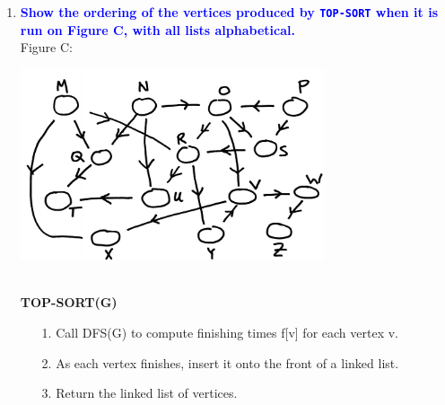\documentclass[11pt]{article}
\begin{document}
\begin{enumerate}
\item \textbf{\textcolor{blue}{Show the ordering of the vertices produced by {\tt TOP-SORT}
when it is run on Figure C, with all lists alphabetical.}}
\\ Figure C: \\
\begin{center}
    \includegraphics[width=90mm]{figureC.jpg}
\end{center}
    \\ \textbf{TOP-SORT(G)}
    \begin{itemize}
        \item [1.] Call DFS(G) to compute finishing times f[v] for each vertex v.
        \item [2.] As each vertex finishes, insert it onto the front of a linked list.
        \item [3.] Return the linked list of vertices.
    \end{itemize}
    

\end{enumerate}
\end{document}
